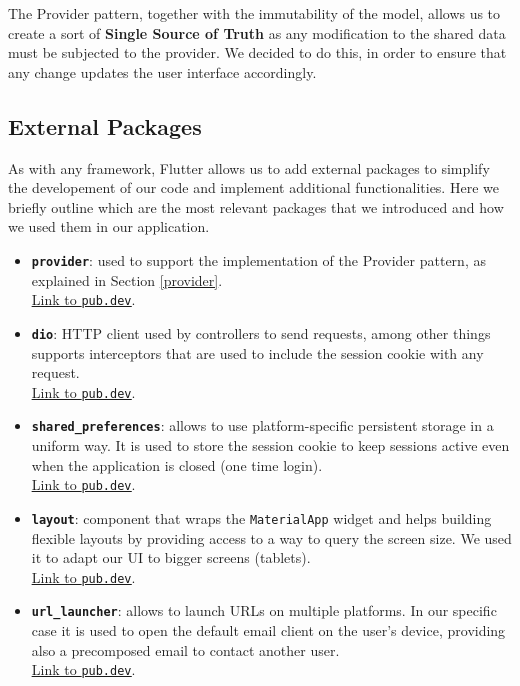 The Provider pattern, together with the immutability of the model, allows us to create a sort of \textbf{Single Source of Truth} as any modification to the shared data must be subjected to the provider.
We decided to do this, in order to ensure that any change updates the user interface accordingly.

\subsection{External Packages}
As with any framework, Flutter allows us to add external packages to simplify the developement of our code and implement additional functionalities.
Here we briefly outline which are the most relevant packages that we introduced and how we used them in our application.
\begin{itemize}
      \item \textbf{\texttt{provider}}:
            used to support the implementation of the Provider pattern, as explained in Section \ref{provider}.\\
            \underline{\href{https://pub.dev/packages/provider}{Link to \texttt{pub.dev}}}.
      \item \textbf{\texttt{dio}}:
            HTTP client used by controllers to send requests, among other things supports interceptors that are
            used to include the session cookie with any request.\\
            \underline{\href{https://pub.dev/packages/dio}{Link to \texttt{pub.dev}}}.
      \item \textbf{\texttt{shared\_preferences}}:
            allows to use platform-specific persistent storage in a uniform way. It is used to store the session
            cookie to keep sessions active even when the application is closed (one time login).\\
            \underline{\href{https://pub.dev/packages/shared_preferences}{Link to \texttt{pub.dev}}}.
      \item \textbf{\texttt{layout}}:
            component that wraps the \texttt{MaterialApp} widget and helps building flexible layouts by providing
            access to a way to query the screen size. We used it to adapt our UI to bigger screens (tablets).\\
            \underline{\href{https://pub.dev/packages/layout}{Link to \texttt{pub.dev}}}.
      \item \textbf{\texttt{url\_launcher}}:
            allows to launch URLs on multiple platforms. In our specific case it is used to open the default email
            client on the user's device, providing also a precomposed email to contact another user.\\
            \underline{\href{https://pub.dev/packages/url_launcher}{Link to \texttt{pub.dev}}}.
\end{itemize}

